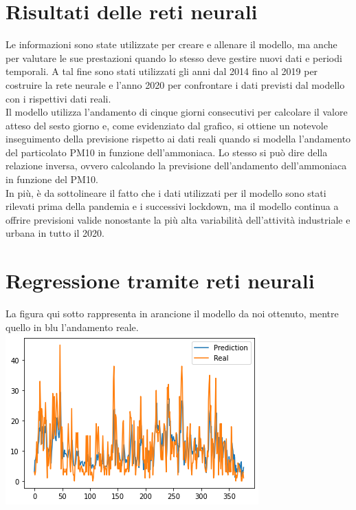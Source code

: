 \documentclass{article}
\begin{document}
\section{Risultati delle reti neurali}
Le informazioni sono state utilizzate per creare e allenare il modello, ma anche per valutare le sue prestazioni quando lo stesso deve gestire nuovi dati e periodi temporali. A tal fine sono stati utilizzati gli anni dal 2014 fino al 2019 per costruire la rete neurale e l’anno 2020 per confrontare i dati previsti dal modello con i rispettivi dati reali.
\\Il modello utilizza l’andamento di cinque giorni consecutivi per calcolare il valore atteso del sesto giorno e, come evidenziato dal grafico, si ottiene un notevole inseguimento della previsione rispetto ai dati reali quando si modella l’andamento del particolato PM10 in funzione dell’ammoniaca. Lo stesso si può dire della relazione inversa, ovvero calcolando la previsione dell’andamento dell’ammoniaca in funzione del PM10.
\\In più, è da sottolineare il fatto che i dati utilizzati per il modello sono stati rilevati prima della pandemia e i successivi lockdown, ma il modello continua a offrire previsioni valide nonostante la più alta variabilità dell’attività industriale e urbana in tutto il 2020. 

\section{Regressione tramite reti neurali}
La figura qui sotto rappresenta in arancione il modello da noi ottenuto, 
mentre quello in blu l'andamento reale.
    \includegraphics[scale = 0.5]{Immagini/regressionePM25.PNG}
\end{document}

